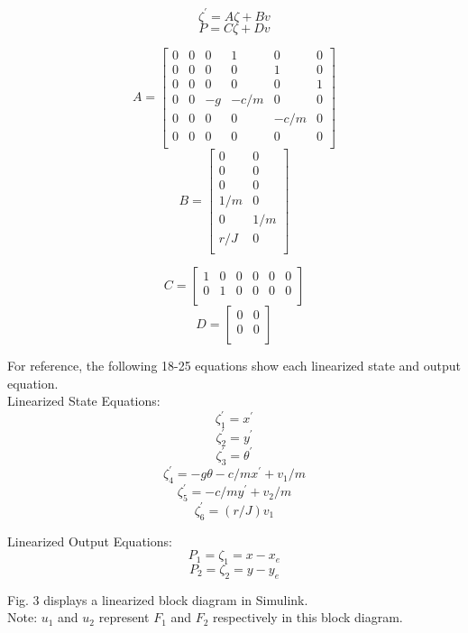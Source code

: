 \documentclass[conference]{IEEEtran}
\begin{document}
\[
\zeta^\prime = A\zeta + Bv
\tag{12}
\] 
\[
P = C\zeta + Dv
\tag{13}
\] 

\[
A = 
\begin{bmatrix}
0&0& 0& 1& 0 &0\\
0 &0 &0 &0 &1 &0\\
0 &0 &0 &0 &0 &1\\
0 &0 &-g& -c/m &0 &0\\
0 &0 &0 &0 &-c/m &0\\
0 &0 &0 &0 &0 &0\\
\end{bmatrix}
\tag{14}
\]
\[
B = 
\begin{bmatrix}
0 &0\\
0 &0\\
0 &0\\
1/m& 0\\
0 &1/m\\
r/J& 0\\
\end{bmatrix}
\tag{15}
\] 

\[
C = 
\begin{bmatrix}
1&0&0&0&0&0\\
0&1&0&0&0&0\\
\end{bmatrix}
\tag{16}
\]
\[
D =
\begin{bmatrix}
0&0\\
0&0\\
\end{bmatrix}
\tag{17}
\] 

For reference, the following 18-25 equations show each linearized state and output equation.\\ 

Linearized State Equations:
\[
\zeta_1^\prime = x^\prime\tag{18}
\] 
\[
\zeta_2^\prime = y^\prime\tag{19}
\]
\[
 \zeta_3^\prime = \theta^\prime \tag{20}
\]
\[
\zeta_4^\prime = -g\theta -c/mx^\prime + v_1/m \tag{21}
\]
\[
\zeta_5^\prime = -c/my^\prime + v_2/m \tag{22}
\]
\[
\zeta_6^\prime = (r/J)v_1 \tag{23}
\]

Linearized Output Equations:
\[
P_1 = \zeta_1 = x - x_e \tag{24}
\]
\[
P_2 = \zeta_2 = y - y_e \tag{25}
\]

\newpage
Fig. 3 displays a linearized block diagram in Simulink. \\
Note: $u_1$ and $u_2$ represent $F_1$ and $F_2$ respectively in this block diagram. \\
\end{document}
